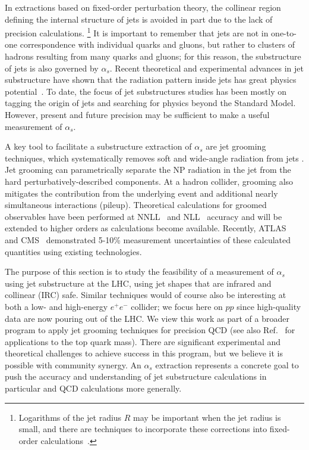 \documentclass[11pt]{cernrep}
\begin{document}
In extractions based on fixed-order perturbation theory, the collinear region defining the internal
structure of jets is avoided in part due to the lack of precision calculations.%
\footnote{Logarithms of the jet radius $R$ may be important when the jet radius is small, and there are techniques to incorporate these corrections into fixed-order calculations~\cite{Dasgupta:2016bnd,Dasgupta:2014yra}.}
%
It is important to remember that jets are not in one-to-one correspondence with individual quarks and gluons, but rather to clusters of hadrons resulting from many quarks and gluons; for this reason, the substructure of jets is also governed by $\alpha_s$.
%
Recent theoretical and experimental advances in jet substructure have shown that the radiation pattern inside jets has great physics potential~\cite{Abdesselam:2010pt,Altheimer:2012mn,Altheimer:2013yza,Adams:2015hiv,Larkoski:2017jix}.
%
To date, the focus of jet substructures studies has been mostly on tagging the origin of jets and searching for physics beyond the Standard Model.
%
However, present and future precision may be sufficient to make a useful measurement of $\alpha_s$.

A key tool to facilitate a substructure extraction of $\alpha_s$ are jet grooming techniques, which systematically removes soft and wide-angle radiation from jets \cite{Butterworth:2008iy,Ellis:2009su,Ellis:2009me,Krohn:2009th,Dasgupta:2013ihk,Larkoski:2014wba}.
%
Jet grooming can parametrically separate the NP radiation in the jet from the hard perturbatively-described components.
%
At a hadron collider, grooming also mitigates the contribution from the underlying event and additional nearly simultaneous interactions (pileup).
%
Theoretical calculations for groomed observables have been performed at NNLL~\cite{Frye:2016okc,Frye:2016aiz} and NLL~\cite{Marzani:2017mva,Marzani:2017kqd} accuracy and will be extended to higher orders as calculations become available.
%
Recently, ATLAS~\cite{Aaboud:2017qwh} and CMS~\cite{CMS-PAS-SMP-16-010} demonstrated 5-10\% measurement uncertainties of these calculated quantities using existing technologies.

The purpose of this section is to study the feasibility of a measurement of $\alpha_s$ using jet substructure at the LHC, using jet shapes that are infrared and collinear (IRC) safe.
%
Similar techniques would of course also be interesting at both a low- and high-energy $e^+e^-$ collider; we focus here on $pp$ since high-quality data are now pouring out of the LHC.
%
We view this work as part of a broader program to apply jet grooming techniques for precision QCD (see also Ref.~\cite{Hoang:2017kmk} for applications to the top quark mass).
%
There are significant experimental and theoretical challenges to achieve success in this program, but we believe it is possible with community synergy.
%
An $\alpha_s$ extraction represents a concrete goal to push the accuracy and understanding of jet substructure calculations in particular and QCD calculations more generally.
\end{document}
